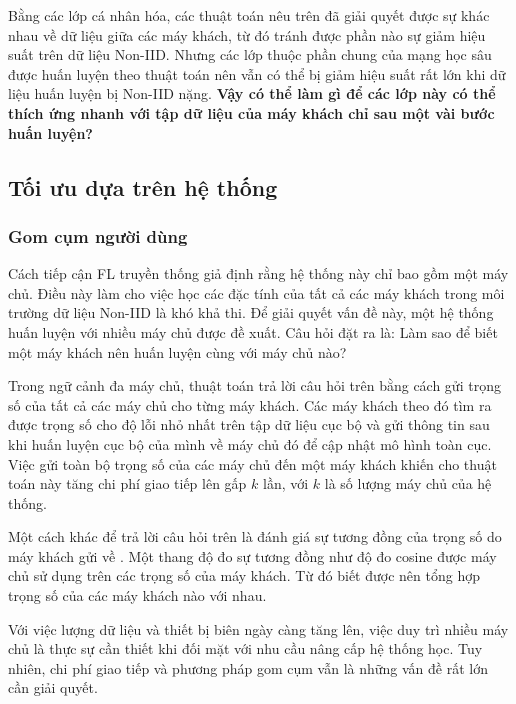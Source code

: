 \label{open_question}
Bằng các lớp cá nhân hóa, các thuật toán nêu trên đã giải quyết được sự khác nhau về dữ liệu giữa các máy khách, từ đó tránh được phần nào sự giảm hiệu suất trên dữ liệu Non-IID. Nhưng các lớp thuộc phần chung của mạng học sâu được huấn luyện theo thuật toán  nên vẫn có thể bị giảm hiệu suất rất lớn khi dữ liệu huấn luyện bị Non-IID nặng. \textbf{Vậy có thể làm gì để các lớp này có thể thích ứng nhanh với tập dữ liệu của máy khách chỉ sau một vài bước huấn luyện?}

\subsection{Tối ưu dựa trên hệ thống}

\subsubsection{Gom cụm người dùng}

Cách tiếp cận FL truyền thống giả định rằng hệ thống này chỉ bao gồm một máy chủ. Điều này làm cho việc học các đặc tính của tất cả các máy khách trong môi trường dữ liệu Non-IID là khó khả thi. Để giải quyết vấn đề này, một hệ thống huấn luyện với nhiều máy chủ được đề xuất. Câu hỏi đặt ra là: Làm sao để biết một máy khách nên huấn luyện cùng với máy chủ nào? 

Trong ngữ cảnh đa máy chủ, thuật toán  \cite{ghosh2020efficient} trả lời câu hỏi trên bằng cách gửi trọng số của tất cả các máy chủ cho từng máy khách. Các máy khách theo đó tìm ra được trọng số cho độ lỗi nhỏ nhất trên tập dữ liệu cục bộ và gửi thông tin sau khi huấn luyện cục bộ của mình về máy chủ đó để cập nhật mô hình toàn cục. Việc gửi toàn bộ trọng số của các máy chủ đến một máy khách khiến cho thuật toán này tăng chi phí giao tiếp lên gấp $k$ lần, với $k$ là số lượng máy chủ của hệ thống.

Một cách khác để trả lời câu hỏi trên là đánh giá sự tương đồng của trọng số do máy khách gửi về \cite{zhu2021federated}. Một thang độ đo sự tương đồng như độ đo cosine được máy chủ sử dụng trên các trọng số của máy khách. Từ đó biết được nên tổng hợp trọng số của các máy khách nào với nhau.

Với việc lượng dữ liệu và thiết bị biên ngày càng tăng lên, việc duy trì nhiều máy chủ là thực sự cần thiết khi đối mặt với nhu cầu nâng cấp hệ thống học. Tuy nhiên, chi phí giao tiếp và phương pháp gom cụm vẫn là những vấn đề rất lớn cần giải quyết.

